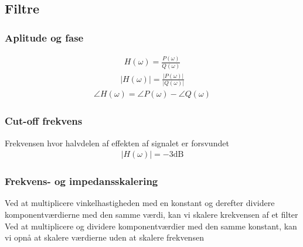 \subsection{Filtre}
	\subsubsection{Aplitude og fase}
		\begin{align}
			H(\omega)=\frac{P(\omega)}{Q(\omega)}
		\end{align}
		\begin{align}
			|H(\omega)|=\frac{|P(\omega)|}{|Q(\omega)|}
		\end{align}
		\begin{align}
			\angle H(\omega)=\angle P(\omega)-\angle Q(\omega)
		\end{align}

	\subsubsection{Cut-off frekvens}
		Frekvensen hvor halvdelen af effekten af signalet er forsvundet
		\begin{align}
			|H(\omega)|=-3\text{dB}
		\end{align}
	
	\subsubsection{Frekvens- og impedansskalering}
		Ved at multiplicere vinkelhastigheden med en konstant og derefter dividere komponentværdierne med den samme værdi, kan vi skalere krekvensen af et filter\\
		Ved at multiplicere og dividere komponentværdier med den samme konstant, kan vi opnå at skalere værdierne uden at skalere frekvensen